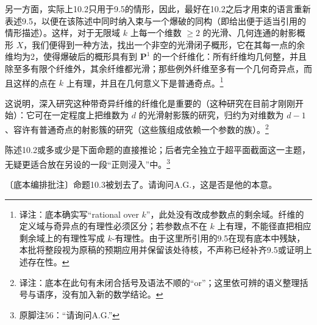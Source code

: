 \documentclass[openany]{ctexbook}
\newcommand{\note}[1]{\footnote{译注：#1}}
\begin{document}
另一方面，实际上10.2只用于9.5的情形，因此，最好在10.2之后才用束的语言重新表述9.5，以便在该陈述中同时纳入束与一个爆破的同构（即给出便于适当引用的情形描述）。这样，对于无限域 $k$ 上每一个维数 $\ge2$ 的光滑、几何连通的射影概形 $X$，我们便得到一种方法，找出一个非空的光滑闭子概形，它在其每一点的余维均为2，使得爆破后的概形具有到 $\mathbf P^1$ 的一个纤维化：所有纤维均几何整，并且除至多有限个纤维外，其余纤维都光滑；那些例外纤维至多有一个几何奇异点，而且这样的点在 $k$ 上有理，并且在几何意义下是普通奇点。\note{底本确实写“rational over $k$”，此处没有改成参数点的剩余域。纤维的定义域与奇异点的有理性必须区分；若参数点不在 $k$ 上有理，不能径直把相应剩余域上的有理性写成 $k$-有理性。由于这里所引用的9.5在现有底本中残缺，本批将整段视为原稿的预期应用并保留该处待核，不声称已经补齐9.5或证明上述存在性。}

这说明，深入研究这种带奇异纤维的纤维化是重要的（这种研究在目前才刚刚开始）：它可在一定程度上把维数为 $d$ 的光滑射影簇的研究，归约为对维数为 $d-1$、容许有普通奇点的射影簇的研究（这些簇组成依赖一个参数的族）。\note{底本在此句有未闭合括号及语法不顺的“or”；这里依可辨的语义整理括号与语序，没有加入新的数学结论。}

陈述10.2或多或少是下面命题的直接推论；后者完全独立于超平面截面这一主题，无疑更适合放在另设的一段“正则浸入”中。\footnote{原脚注56：“请询问A.G.”}

〔底本编排批注〕命题10.3被划去了。请询问A.G.，这是否是他的本意。
\end{document}

